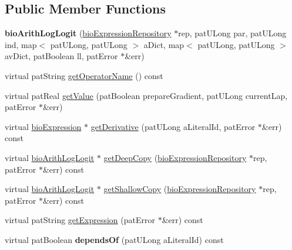 \subsection*{Public Member Functions}
\begin{DoxyCompactItemize}
\item 
\mbox{\label{classbio_arith_log_logit_a42a95d4fa01326e82a4768cc6f6bdcd1}} 
{\bfseries bio\+Arith\+Log\+Logit} (\hyperlink{classbio_expression_repository}{bio\+Expression\+Repository} $\ast$rep, pat\+U\+Long par, pat\+U\+Long ind, map$<$ pat\+U\+Long, pat\+U\+Long $>$ a\+Dict, map$<$ pat\+U\+Long, pat\+U\+Long $>$ av\+Dict, pat\+Boolean ll, pat\+Error $\ast$\&err)
\item 
virtual pat\+String \hyperlink{classbio_arith_log_logit_adb9566e06a59ee20cf8b0bc8897b95cd}{get\+Operator\+Name} () const
\item 
virtual pat\+Real \hyperlink{classbio_arith_log_logit_a1d6319d3ce72bda30bc036fdf678e36c}{get\+Value} (pat\+Boolean prepare\+Gradient, pat\+U\+Long current\+Lap, pat\+Error $\ast$\&err)
\item 
virtual \hyperlink{classbio_expression}{bio\+Expression} $\ast$ \hyperlink{classbio_arith_log_logit_a88dd7f743a13f5b836d2c4008d09845f}{get\+Derivative} (pat\+U\+Long a\+Literal\+Id, pat\+Error $\ast$\&err) const
\item 
virtual \hyperlink{classbio_arith_log_logit}{bio\+Arith\+Log\+Logit} $\ast$ \hyperlink{classbio_arith_log_logit_a95be99c67edc6920cea644dcf14c2775}{get\+Deep\+Copy} (\hyperlink{classbio_expression_repository}{bio\+Expression\+Repository} $\ast$rep, pat\+Error $\ast$\&err) const
\item 
virtual \hyperlink{classbio_arith_log_logit}{bio\+Arith\+Log\+Logit} $\ast$ \hyperlink{classbio_arith_log_logit_abf229e9d9897a4f5f0bc3c2e158c24f8}{get\+Shallow\+Copy} (\hyperlink{classbio_expression_repository}{bio\+Expression\+Repository} $\ast$rep, pat\+Error $\ast$\&err) const
\item 
virtual pat\+String \hyperlink{classbio_arith_log_logit_a2683202928e4c00aa06460027a5aa332}{get\+Expression} (pat\+Error $\ast$\&err) const
\item 
\mbox{\label{classbio_arith_log_logit_a4c7deadcd687ad799f0e499b697b817c}} 
virtual pat\+Boolean {\bfseries depends\+Of} (pat\+U\+Long a\+Literal\+Id) const
\item 
\mbox{\label{classbio_arith_log_logit_a6cf16644376b4e37d95453e8ccc7fe16}} 

\end{DoxyCompactItemize}
